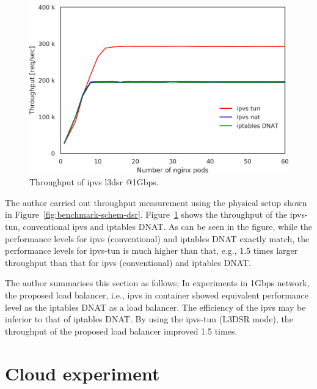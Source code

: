\begin{figure}[h]
  \centering
  \includegraphics[width=0.8\columnwidth]{Figs/ipvs_l3dsr_1g.png}
  \caption{Throughput of ipvs l3dsr @1Gbps.}
  \label{fig:ipvs_l3dsr_1g.png}
\end{figure}

The author carried out throughput measurement using the physical setup shown in Figure~\ref{fig:benchmark-schem-dsr}.
Figure~\ref{fig:ipvs_l3dsr_1g.png} shows the throughput of the ipvs-tun, conventional ipvs and iptables DNAT.
As can be seen in the figure, while the performance levels for ipvs (conventional) and iptables DNAT exactly match, the performance levels for ipvs-tun is much higher than that, e.g., 1.5 times larger throughput than that for ipvs (conventional) and iptables DNAT.


The author summarises this section as follows;
In experiments in 1Gbps network, the proposed load balancer, i.e., ipvs in container showed equivalent performance level as the iptables DNAT as a load balancer.
The efficiency of the ipvs may be inferior to that of iptables DNAT.
By using the ipvs-tun (L3DSR mode), the throughput of the proposed load balancer improved 1.5 times.

\FloatBarrier

\section{Cloud experiment}


